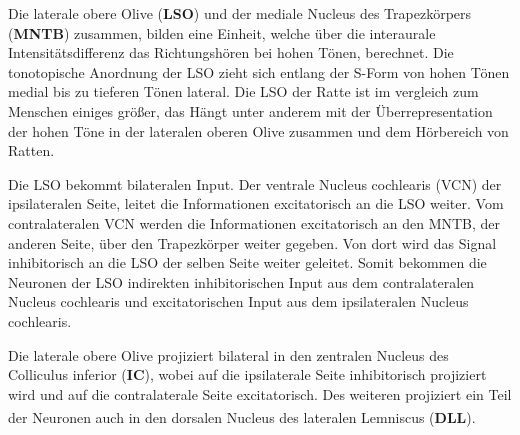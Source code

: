 \documentclass[12pt,a4paper,pdftex]{article}
\begin{document}
 
\noindent Die laterale obere Olive (\textbf{LSO}) und der mediale Nucleus des Trapezkörpers (\textbf{MNTB}) zusammen, bilden eine Einheit, welche über die interaurale Intensitätsdifferenz das Richtungshören bei hohen Tönen, berechnet. 
 Die tonotopische Anordnung der LSO zieht sich entlang der S-Form von hohen Tönen medial bis zu tieferen Tönen lateral. Die LSO der Ratte ist im vergleich zum Menschen einiges größer, das Hängt unter anderem mit der Überrepresentation der hohen Töne in der lateralen oberen Olive zusammen und dem Hörbereich von Ratten.

Die LSO bekommt bilateralen Input. Der ventrale Nucleus cochlearis (VCN) der ipsilateralen Seite, leitet die Informationen excitatorisch an die LSO weiter. Vom contralateralen VCN werden die Informationen excitatorisch an den MNTB, der anderen Seite, über den Trapezkörper weiter gegeben. Von dort wird das Signal inhibitorisch an die LSO der selben Seite weiter geleitet.
Somit bekommen die Neuronen der LSO indirekten inhibitorischen Input aus dem contralateralen Nucleus cochlearis und excitatorischen Input aus dem ipsilateralen Nucleus cochlearis.

Die laterale obere Olive projiziert bilateral in den zentralen Nucleus des Colliculus inferior (\textbf{IC}), wobei auf die ipsilaterale Seite inhibitorisch projiziert wird und auf die contralaterale Seite excitatorisch.
Des weiteren projiziert ein Teil der Neuronen auch in den dorsalen Nucleus des lateralen Lemniscus (\textbf{DLL})\textsuperscript{\cite[29]{paxinos2014rat}}.
\end{document}

